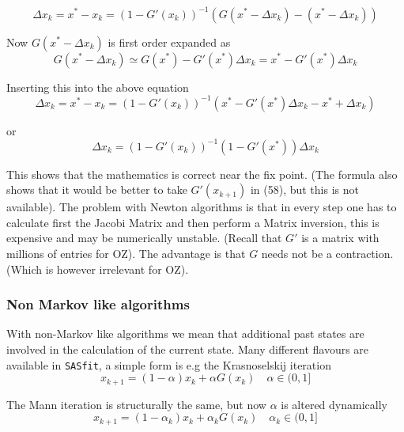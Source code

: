 \documentclass[11pt,a4paper]{article}
\begin{document}
\begin{equation}
\Delta x_k = x^{*} - x_k = (1 - G'(x_k))^{-1}(G(x^{*} - \Delta x_k) - (x^{*} - \Delta x_k))
\end{equation}

Now $G(x^{*} - \Delta x_k)$ is first order expanded as 
\begin{equation}
G(x^{*} - \Delta x_k) \simeq G(x^{*}) - G'(x^{*})\Delta x_k = x^{*} - G'(x^{*})\Delta x_k
\end{equation}


Inserting this into the above equation
\begin{equation}
\Delta x_k = x^{*} - x_k = (1 - G'(x_k))^{-1}(x^{*} - G'(x^{*})\Delta x_k - x^{*} + \Delta x_k)
\end{equation}

or
\begin{equation}
\Delta x_k = (1 - G'(x_k))^{-1} (1 - G'(x^{*}))\Delta x_k
\end{equation}

This shows that the mathematics is correct near the fix point. (The formula also shows that it would be better to take $G'(x_{k+1})$ in (58),
but this is not available). \newline
The problem with Newton algorithms is that in every step one has to calculate first the Jacobi Matrix and then perform a
Matrix inversion, this is expensive and may be numerically unstable. (Recall that $G'$ is a matrix with millions of entries for OZ).
The advantage is that $G$ needs not be a contraction. (Which is however irrelevant for OZ).

\subsubsection{Non Markov like algorithms}
With non-Markov like algorithms we mean that additional past states are involved in the calculation of the current state.
Many different flavours are available in \texttt{SASfit}, a simple form is e.g the Krasnoselskij iteration
\begin{equation}
x_{k+1} = (1 - \alpha) x_k + \alpha G(x_k) \quad
\alpha \in (0,1]
\end{equation}

The Mann iteration is structurally the same, but now $\alpha$ is altered dynamically
\begin{equation}
x_{k+1} = (1 - \alpha_k) x_k + \alpha_k G(x_k) \quad
\alpha_k \in (0,1]
\end{equation}
\end{document}
